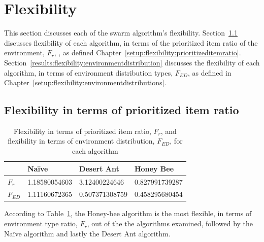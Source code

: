 \section{Flexibility}
\label{results:flexibility}

This section discusses each of the swarm algorithm's flexibility. Section~\ref{results:prioritizeditemratio} discusses flexibility of each algorithm, in terms of the prioritized item ratio of the environment, $F_r$, , as defined Chapter~\ref{setup:flexibility:prioritizeditemratio}.  Section~\ref{results:flexibility:environmentdistribution} discusses the flexibility of each algorithm, in terms of environment distribution types, $F_{ED}$, as defined in Chapter~\ref{setup:flexibility:environmentdistributions}.

\subsection{Flexibility in terms of prioritized item ratio}
\label{results:prioritizeditemratio}

\begin{table}[]
\centering
\caption{Flexibility in terms of prioritized item ratio, $F_r$, and flexibility in terms of environment distribution, $F_{ED}$, for each algorithm}
\label{table:flexibility}
\begin{tabular}{@{}llll@{}}
\toprule
\textbf{}         & Na\"ive         & Desert Ant        & Honey Bee         \\ \midrule
\textbf{$F_r$}    & 1.18580054603 & 3.12400224646     & 0.827991739287    \\ \midrule
\textbf{$F_{ED}$} & 1.11160672365 & 0.507371308759 & 0.458295680454 
\end{tabular}
\end{table}

According to Table~\ref{table:flexibility}, the Honey-bee algorithm is the most flexible, in terms of environment type ratio, $F_r$, out of the the algorithms examined, followed by the Na\"ive algorithm and lastly the Desert Ant algorithm. 

